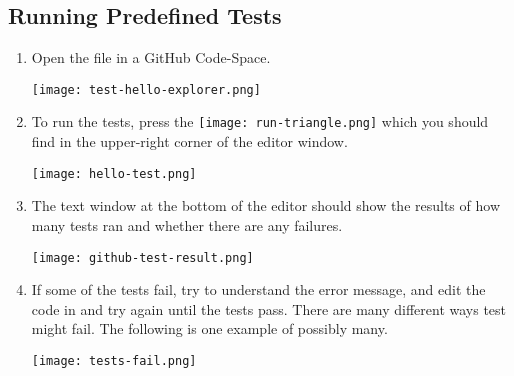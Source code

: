 \subsection{Running Predefined Tests}
\label{sec.run.tests}
\begin{enumerate}


\item Open the file  in a GitHub Code-Space.

\nopagebreak
\noindent\texttt{[image: test-hello-explorer.png]}

\item To run the tests, press the
\texttt{[image: run-triangle.png]} which you should find in
the upper-right corner of the editor window.

\nopagebreak
\noindent\texttt{[image: hello-test.png]}


\item The text window at the bottom of the editor should show the results of
how many tests ran and whether there are any failures.

\nopagebreak
\noindent\texttt{[image: github-test-result.png]}

\item If some of the tests fail, try to understand the error message, and edit
  the code in  and try again until the tests pass.  There are many
  different ways test might fail.  The following is one example of possibly many.

\nopagebreak
\noindent\texttt{[image: tests-fail.png]}


\end{enumerate}

\clearpage

